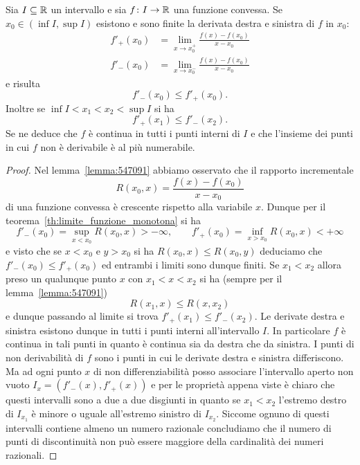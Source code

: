 \begin{theorem}
  Sia $I\subseteq {\mathbb R}$ un intervallo e sia $f\colon I \to {\mathbb R}$ una funzione convessa.
  Se $x_0\in (\inf I, \sup I)$ esistono e sono finite la derivata destra 
  e sinistra di $f$ in $x_0$:
  \begin{align*}
    f'_+(x_0) &= \lim_{x\to x_0^+} \frac{f(x)-f(x_0)}{x-x_0}\\
    f'_-(x_0)  &= \lim_{x\to x_0^-} \frac{f(x)-f(x_0)}{x-x_0}  
  \end{align*}
  e risulta
  \[
    f'_-(x_0) \le f'_+(x_0).
  \]
  Inoltre se $\inf I < x_1 < x_2 < \sup I$ si ha 
  \[
    f'_+(x_1) \le f'_-(x_2).
  \]
  Se ne deduce che $f$ è continua in tutti i punti interni di $I$ 
  e che l'insieme dei punti in cui $f$ non è derivabile 
  è al più numerabile.
  \end{theorem}
  \begin{proof}
    Nel lemma~\ref{lemma:547091} abbiamo osservato che il rapporto incrementale
    \[
      R(x_0,x) = \frac{f(x)-f(x_0)}{x-x_0}
    \] 
    di una funzione convessa è crescente rispetto alla variabile $x$. 
    Dunque per il teorema~\ref{th:limite_funzione_monotona} si 
    ha 
    \[
      f'_-(x_0) = \sup_{x<x_0} R(x_0,x)>-\infty, \qquad 
      f'_+(x_0) = \inf_{x>x_0} R(x_0,x)<+\infty
    \]
    e visto che se $x<x_0$ e $y>x_0$ si ha $R(x_0,x)\le R(x_0,y)$ 
    deduciamo che $f'_-(x_0)\le f'_+(x_0)$ ed entrambi i limiti 
    sono dunque finiti. Se $x_1 < x_2$ allora preso un qualunque 
    punto $x$ con $x_1<x<x_2$ si ha (sempre per il lemma~\ref{lemma:547091})
    \[
      R(x_1,x) \le R(x,x_2)
    \]
    e dunque passando al limite si trova $f'_+(x_1) \le f'_-(x_2)$.
    Le derivate destra e sinistra esistono dunque in tutti i punti interni 
    all'intervallo $I$. 
    In particolare $f$ è continua in tali punti in quanto è continua sia da destra 
    che da sinistra.
    I punti di non derivabilità di $f$ sono i punti in cui 
    le derivate destra e sinistra differiscono. 
    Ma ad ogni punto $x$ di non differenziabilità 
    posso associare l'intervallo aperto non vuoto $I_x = (f'_-(x),f'_+(x))$ e per 
    le proprietà appena viste è chiaro che questi intervalli sono a due a due disgiunti
    in quanto se $x_1<x_2$ l'estremo destro di $I_{x_1}$ è minore o uguale all'estremo 
    sinistro di $I_{x_2}$.
    Siccome ognuno di questi intervalli contiene almeno un numero razionale concludiamo che 
    il numero di punti di discontinuità non può essere maggiore della cardinalità 
    dei numeri razionali.
  \end{proof}
  
